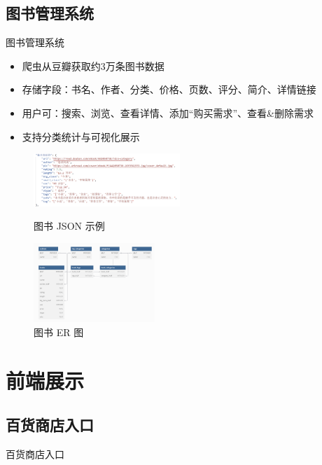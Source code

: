\documentclass{ctexbeamer}
\begin{document}
\subsection{图书管理系统}
\begin{frame}{图书管理系统}
  \begin{itemize}
    \item 爬虫从豆瓣获取约3万条图书数据
    \item 存储字段：书名、作者、分类、价格、页数、评分、简介、详情链接
    \item 用户可：搜索、浏览、查看详情、添加“购买需求”、查看&删除需求
    \item 支持分类统计与可视化展示
  \end{itemize}
  \vspace{0.3cm}
  \begin{figure}
    \centering
    \begin{minipage}{0.3\textwidth}
      \centering
      \includegraphics[height=2cm]{fig/bookJSON.png}
      \caption{图书 JSON 示例}
    \end{minipage}
    \hfill
    \begin{minipage}{0.45\textwidth}
      \centering
      \includegraphics[height=3cm]{fig/bookER.png}
      \caption{图书 ER 图}
    \end{minipage}
  \end{figure}
\end{frame}

\section{前端展示}

\subsection{百货商店入口}
\begin{frame}{百货商店入口}
\end{frame}
\end{document}
